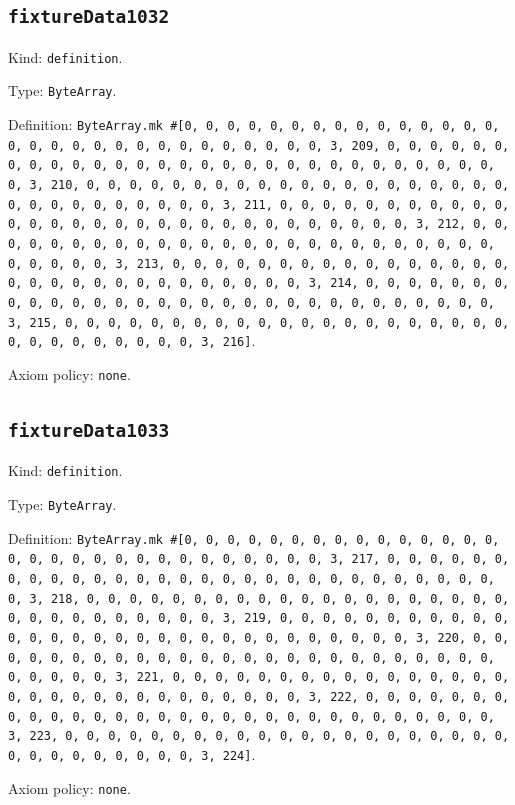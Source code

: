\documentclass[11pt]{article}
\begin{document}
\subsection*{\texttt{fixtureData1032}}
\noindent Kind: \texttt{definition}.\par
\noindent Type: \texttt{ByteArray}.\par
\noindent Definition: \texttt{ByteArray.mk \#[0, 0, 0, 0, 0, 0, 0, 0, 0, 0, 0, 0, 0, 0, 0, 0, 0, 0, 0, 0, 0, 0, 0, 0, 0, 0, 0, 0, 0, 0, 3, 209, 0, 0, 0, 0, 0, 0, 0, 0, 0, 0, 0, 0, 0, 0, 0, 0, 0, 0, 0, 0, 0, 0, 0, 0, 0, 0, 0, 0, 0, 0, 3, 210, 0, 0, 0, 0, 0, 0, 0, 0, 0, 0, 0, 0, 0, 0, 0, 0, 0, 0, 0, 0, 0, 0, 0, 0, 0, 0, 0, 0, 0, 0, 3, 211, 0, 0, 0, 0, 0, 0, 0, 0, 0, 0, 0, 0, 0, 0, 0, 0, 0, 0, 0, 0, 0, 0, 0, 0, 0, 0, 0, 0, 0, 0, 3, 212, 0, 0, 0, 0, 0, 0, 0, 0, 0, 0, 0, 0, 0, 0, 0, 0, 0, 0, 0, 0, 0, 0, 0, 0, 0, 0, 0, 0, 0, 0, 3, 213, 0, 0, 0, 0, 0, 0, 0, 0, 0, 0, 0, 0, 0, 0, 0, 0, 0, 0, 0, 0, 0, 0, 0, 0, 0, 0, 0, 0, 0, 0, 3, 214, 0, 0, 0, 0, 0, 0, 0, 0, 0, 0, 0, 0, 0, 0, 0, 0, 0, 0, 0, 0, 0, 0, 0, 0, 0, 0, 0, 0, 0, 0, 3, 215, 0, 0, 0, 0, 0, 0, 0, 0, 0, 0, 0, 0, 0, 0, 0, 0, 0, 0, 0, 0, 0, 0, 0, 0, 0, 0, 0, 0, 0, 0, 3, 216]}.\par
\noindent Axiom policy: \texttt{none}.\par
\subsection*{\texttt{fixtureData1033}}
\noindent Kind: \texttt{definition}.\par
\noindent Type: \texttt{ByteArray}.\par
\noindent Definition: \texttt{ByteArray.mk \#[0, 0, 0, 0, 0, 0, 0, 0, 0, 0, 0, 0, 0, 0, 0, 0, 0, 0, 0, 0, 0, 0, 0, 0, 0, 0, 0, 0, 0, 0, 3, 217, 0, 0, 0, 0, 0, 0, 0, 0, 0, 0, 0, 0, 0, 0, 0, 0, 0, 0, 0, 0, 0, 0, 0, 0, 0, 0, 0, 0, 0, 0, 3, 218, 0, 0, 0, 0, 0, 0, 0, 0, 0, 0, 0, 0, 0, 0, 0, 0, 0, 0, 0, 0, 0, 0, 0, 0, 0, 0, 0, 0, 0, 0, 3, 219, 0, 0, 0, 0, 0, 0, 0, 0, 0, 0, 0, 0, 0, 0, 0, 0, 0, 0, 0, 0, 0, 0, 0, 0, 0, 0, 0, 0, 0, 0, 3, 220, 0, 0, 0, 0, 0, 0, 0, 0, 0, 0, 0, 0, 0, 0, 0, 0, 0, 0, 0, 0, 0, 0, 0, 0, 0, 0, 0, 0, 0, 0, 3, 221, 0, 0, 0, 0, 0, 0, 0, 0, 0, 0, 0, 0, 0, 0, 0, 0, 0, 0, 0, 0, 0, 0, 0, 0, 0, 0, 0, 0, 0, 0, 3, 222, 0, 0, 0, 0, 0, 0, 0, 0, 0, 0, 0, 0, 0, 0, 0, 0, 0, 0, 0, 0, 0, 0, 0, 0, 0, 0, 0, 0, 0, 0, 3, 223, 0, 0, 0, 0, 0, 0, 0, 0, 0, 0, 0, 0, 0, 0, 0, 0, 0, 0, 0, 0, 0, 0, 0, 0, 0, 0, 0, 0, 0, 0, 3, 224]}.\par
\noindent Axiom policy: \texttt{none}.\par
\end{document}
